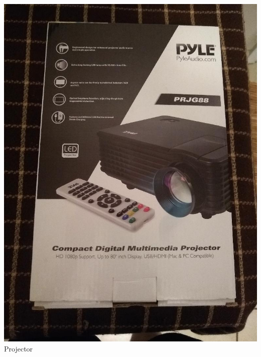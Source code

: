 \documentclass[t]{beamer}
\newcommand{\htarget}[2]{\hypertarget{#1}{#2}}
\begin{document}
\begin{frame}\htarget{projector}{} \begin{center}
\includegraphics[height=0.8\textheight]{projector_mini.jpg} \\
Projector
\end{center} \end{frame}
\end{document}
